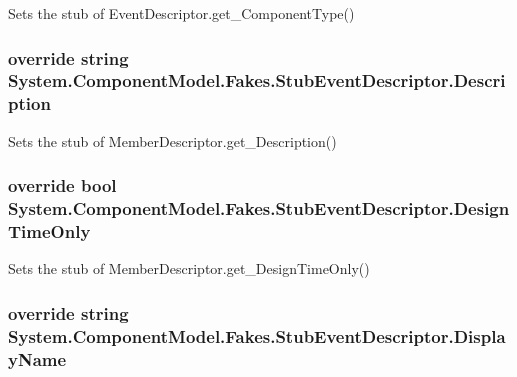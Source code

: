 Sets the stub of Event\-Descriptor.\-get\-\_\-\-Component\-Type()

\hypertarget{class_system_1_1_component_model_1_1_fakes_1_1_stub_event_descriptor_a5c06adf7ca8d153c261d182718a38573}{
\subsubsection[{Description}]{\setlength{\rightskip}{0pt plus 5cm}override string System.\-Component\-Model.\-Fakes.\-Stub\-Event\-Descriptor.\-Description\hspace{0.3cm}{\ttfamily [get]}}}\label{class_system_1_1_component_model_1_1_fakes_1_1_stub_event_descriptor_a5c06adf7ca8d153c261d182718a38573}


Sets the stub of Member\-Descriptor.\-get\-\_\-\-Description()

\hypertarget{class_system_1_1_component_model_1_1_fakes_1_1_stub_event_descriptor_adf563c44f97bd8b864ef66396eee1d6f}{
\subsubsection[{Design\-Time\-Only}]{\setlength{\rightskip}{0pt plus 5cm}override bool System.\-Component\-Model.\-Fakes.\-Stub\-Event\-Descriptor.\-Design\-Time\-Only\hspace{0.3cm}{\ttfamily [get]}}}\label{class_system_1_1_component_model_1_1_fakes_1_1_stub_event_descriptor_adf563c44f97bd8b864ef66396eee1d6f}


Sets the stub of Member\-Descriptor.\-get\-\_\-\-Design\-Time\-Only()

\hypertarget{class_system_1_1_component_model_1_1_fakes_1_1_stub_event_descriptor_a0c7e937a8e94b8bbbc7844e34084a16f}{
\subsubsection[{Display\-Name}]{\setlength{\rightskip}{0pt plus 5cm}override string System.\-Component\-Model.\-Fakes.\-Stub\-Event\-Descriptor.\-Display\-Name\hspace{0.3cm}{\ttfamily [get]}}}\label{class_system_1_1_component_model_1_1_fakes_1_1_stub_event_descriptor_a0c7e937a8e94b8bbbc7844e34084a16f}


